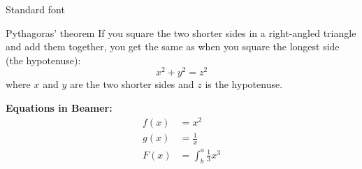 \documentclass{beamer}
\begin{document}
\begin{frame}{Standard font}

\begin{block}{Pythagoras' theorem}
If you square the two shorter sides in a right-angled triangle and add them together, you get the same as when you square the longest side (the hypotenuse):
    \[ x^2 + y^2 = z^2 \]
where $x$ and $y$ are the two shorter sides and $z$ is the hypotenuse.
\end{block}

\textbf{Equations in Beamer: }
\begin{align*}
  f(x) &= x^2\\
  g(x) &= \frac{1}{x}\\
  F(x) &= \int^a_b \frac{1}{3}x^3
\end{align*}

\end{frame}
\end{document}

